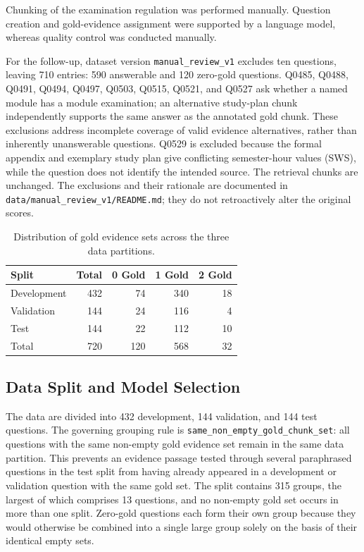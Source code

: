 \documentclass[11pt]{article}
\newcommand{\revision}[1]{{\color{blue}#1}}
\begin{document}
Chunking of the examination regulation was performed manually. Question creation and gold-evidence assignment were supported by a language model, whereas quality control was conducted manually.

\revision{For the follow-up, dataset version \texttt{manual\_review\_v1} excludes ten questions, leaving 710 entries: 590 answerable and 120 zero-gold questions. Q0485, Q0488, Q0491, Q0494, Q0497, Q0503, Q0515, Q0521, and Q0527 ask whether a named module has a module examination; an alternative study-plan chunk independently supports the same answer as the annotated gold chunk. These exclusions address incomplete coverage of valid evidence alternatives, rather than inherently unanswerable questions. Q0529 is excluded because the formal appendix and exemplary study plan give conflicting semester-hour values (SWS), while the question does not identify the intended source. The retrieval chunks are unchanged. The exclusions and their rationale are documented in \nolinkurl{data/manual_review_v1/README.md}; they do not retroactively alter the original scores.}

\begin{table}[t]
\centering
\small
\begin{tabular}{lrrrr}
\toprule
\textbf{Split} & \textbf{Total} & \textbf{0 Gold} & \textbf{1 Gold} & \textbf{2 Gold} \\
\midrule
Development & 432 & 74 & 340 & 18 \\
Validation & 144 & 24 & 116 & 4 \\
Test         & 144 & 22 & 112 & 10 \\
\midrule
Total       & 720 & 120 & 568 & 32 \\
\bottomrule
\end{tabular}
\caption{Distribution of gold evidence sets across the three data partitions.}
\label{tab:gold-distribution}
\end{table}

\subsection{Data Split and Model Selection}

The data are divided into 432 development, 144 validation, and 144 test questions. The governing grouping rule is \texttt{same\_non\_empty\_gold\_chunk\_set}: all questions with the same non-empty gold evidence set remain in the same data partition. This prevents an evidence passage tested through several paraphrased questions in the test split from having already appeared in a development or validation question with the same gold set. The split contains 315 groups, the largest of which comprises 13 questions, and no non-empty gold set occurs in more than one split. Zero-gold questions each form their own group because they would otherwise be combined into a single large group solely on the basis of their identical empty sets.
\end{document}
